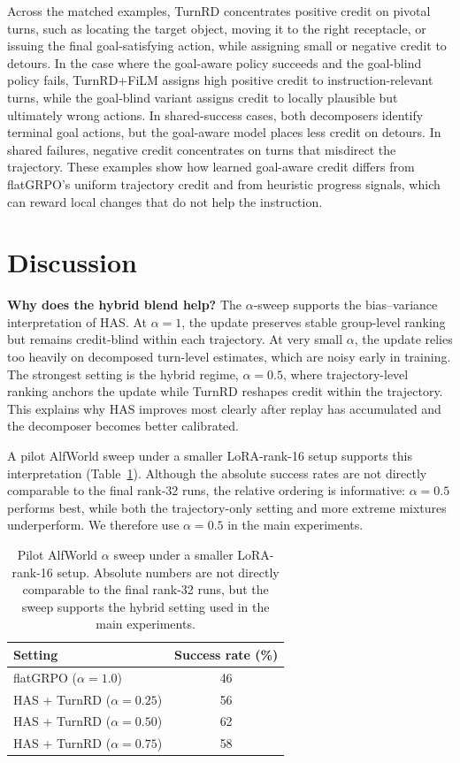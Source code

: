 \documentclass{article}
\begin{document}
Across the matched examples, TurnRD concentrates positive credit on pivotal turns, such as
locating the target object, moving it to the right receptacle, or issuing the final
goal-satisfying action, while assigning small or negative credit to detours. In the case where
the goal-aware policy succeeds and the goal-blind policy fails, TurnRD+FiLM assigns high
positive credit to instruction-relevant turns, while the goal-blind variant assigns credit to
locally plausible but ultimately wrong actions. In shared-success cases, both decomposers
identify terminal goal actions, but the goal-aware model places less credit on detours. In
shared failures, negative credit concentrates on turns that misdirect the trajectory. These
examples show how learned goal-aware credit differs from flatGRPO's uniform trajectory credit
and from heuristic progress signals, which can reward local changes that do not help the
instruction.

\section{Discussion}
\label{sec:discussion}
\textbf{Why does the hybrid blend help?} The $\alpha$-sweep supports the bias--variance
interpretation of HAS. At $\alpha{=}1$, the update preserves stable group-level ranking but
remains credit-blind within each trajectory. At very small $\alpha$, the update relies too
heavily on decomposed turn-level estimates, which are noisy early in training. The strongest
setting is the hybrid regime, $\alpha{=}0.5$, where trajectory-level ranking anchors the
update while TurnRD reshapes credit within the trajectory. This explains why HAS improves most
clearly after replay has accumulated and the decomposer becomes better calibrated.

A pilot AlfWorld sweep under a smaller LoRA-rank-16 setup supports this interpretation
(Table~\ref{tab:alpha-sweep}). Although the absolute success rates are not directly comparable
to the final rank-32 runs, the relative ordering is informative: $\alpha{=}0.5$ performs best,
while both the trajectory-only setting and more extreme mixtures underperform. We therefore use
$\alpha{=}0.5$ in the main experiments.

\begin{table}[H]
  \caption{Pilot AlfWorld $\alpha$ sweep under a smaller LoRA-rank-16 setup. Absolute numbers
  are not directly comparable to the final rank-32 runs, but the sweep supports the hybrid
  setting used in the main experiments.}
  \label{tab:alpha-sweep}
  \centering
  \begin{tabular}{lc}
    \toprule
    Setting & Success rate (\%) \\
    \midrule
    flatGRPO ($\alpha{=}1.0$) & 46 \\
    HAS + TurnRD ($\alpha{=}0.25$) & 56 \\
    HAS + TurnRD ($\alpha{=}0.50$) & 62 \\
    HAS + TurnRD ($\alpha{=}0.75$) & 58 \\
    \bottomrule
  \end{tabular}
\end{table}
\end{document}
